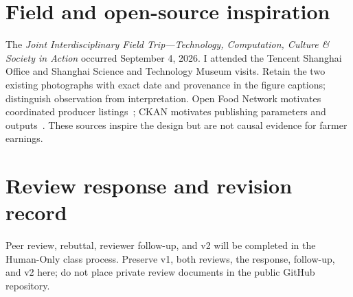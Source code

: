 \section{Field and open-source inspiration}
The \emph{Joint Interdisciplinary Field Trip---Technology, Computation, Culture \& Society in Action} occurred September 4, 2026. I attended the Tencent Shanghai Office and Shanghai Science and Technology Museum visits. Retain the two existing photographs with exact date and provenance in the figure captions; distinguish observation from interpretation. Open Food Network motivates coordinated producer listings~\cite{openfoodnetwork}; CKAN motivates publishing parameters and outputs~\cite{ckan}. These sources inspire the design but are not causal evidence for farmer earnings.
\section{Review response and revision record}
Peer review, rebuttal, reviewer follow-up, and v2 will be completed in the Human-Only class process. Preserve v1, both reviews, the response, follow-up, and v2 here; do not place private review documents in the public GitHub repository.
\clearpage\onecolumn
